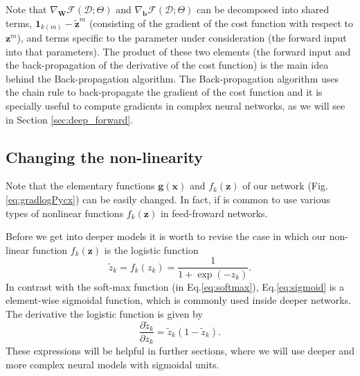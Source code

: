 Note that $\nabla_\mathbf{W}\mathcal{F}(\mathcal{D};\Theta)$ and $\nabla_\mathbf{b}\mathcal{F}(\mathcal{D};\Theta)$ can be decomposed into shared terms, 
$\mathrm{\mathbf{1}}_{k(m)} - \tilde{\mathbf{z}}^m$
%
(consisting of the %
gradient of the cost function %
with respect to $\mathbf{z}^m$), 
and terms specific to the parameter under consideration (the forward input into that parameters).
The product of these two elements (the forward input and the back-propagation of the derivative of the cost function) is the main idea behind the Back-propagation algorithm. The Back-propagation algorithm uses the chain rule to back-propagate the gradient of the cost function %
 and it is specially useful to compute gradients in complex neural networks, as we will see %
in Section \ref{sec:deep_forward}.

\subsection{Changing the non-linearity}

Note that the elementary functions $\mathbf{g}(\mathbf{x})$ and $f_k(\mathbf{z})$ of our network (Fig.\ref{eq:gradlogPycx}) can be easily changed. 
In fact, if is common to use various types of nonlinear functions $f_k(\mathbf{z})$ in feed-froward networks. 

Before we get into deeper models it is worth to revise the case in which our
non-linear function $f_k(\mathbf{z})$ is the logistic function
\begin{equation}
\tilde{z}_k = f_k(z_k) = \frac{1}{1+\exp(-z_k)}.
\label{eq:sigmoid}
\end{equation}
%
In contrast with the soft-max function (in Eq.\ref{eq:softmax}), Eq.\ref{eq:sigmoid} is a element-wise  sigmoidal function, which is commonly used inside deeper networks. The derivative the logistic function is given by 
\begin{equation}
\frac{\partial \tilde{z}_k}{\partial z_k} = \tilde{z}_{k} (1-\tilde{z}_{k}).
\label{eq:partsigmoid}
\end{equation}
%
These expressions will be helpful in further sections, where we will use deeper and more complex neural models with sigmoidal units.

